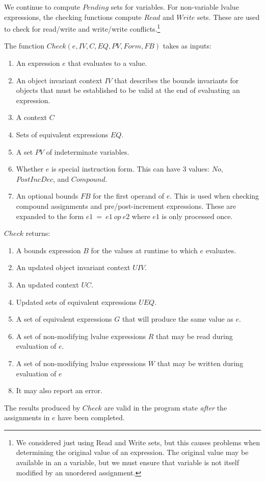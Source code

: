 We continue to compute $Pending$ sets for variables.  For non-variable lvalue expressions,
the checking functions compute $Read$ and $Write$ sets.  These are used to
check for read/write and write/write conflicts.\footnote{We considered just
using Read and Write sets, but this causes problems when determining the
original value of an expression.  The original value may be available in 
an a variable, but we must ensure that variable is not itself modified 
by an unordered assignment.}

The function $Check(e, IV, C, EQ, PV, Form, FB)$ takes as inputs:
\begin{enumerate}
\item An expression $e$ that evaluates to a value.
\item An object invariant context $IV$ that describes the bounds invariants for objects
that must be established to be valid at the end of evaluating an expression.
\item A context $C$
\item Sets of equivalent expressions $EQ$.
\item A set $PV$ of indeterminate variables.
\item Whether $e$ is special instruction form.  This can have 3 values: $No$, $PostIncDec$,
and $Compound$.
\item An optional bounds $FB$ for the first operand of $e$.  
This is used when checking compound assignments and pre/post-increment expressions.  These are
expanded to the form $e1~=~e1~op~e2$ where $e1$ is only processed once. 
\end{enumerate}

$Check$ returns:
\begin{enumerate}
\item A bounds expression $B$ for the values at runtime to which $e$ evaluates.
\item An updated object invariant context $UIV$.
\item An updated context $\mathit{UC}$.
\item Updated sets of equivalent expressions $UEQ$.
\item A set of equivalent expressions $G$ that will produce the same value as $e$. 
\item A set of non-modifying lvalue expressions $R$ that may be read during evaluation of $e$.
\item A set of non-modifying lvalue expressions $W$ that may be written during evaluation of $e$
\item It may also report an error.
\end{enumerate}
The results produced by $Check$ are valid in the program state
{\em after} the assignments in $e$ have been completed.

